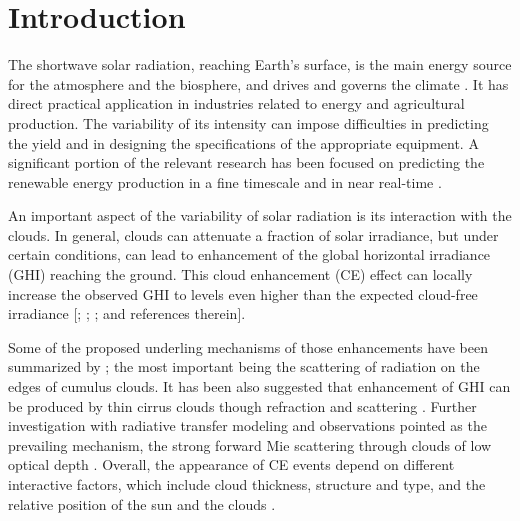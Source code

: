 \documentclass[preprint, 5p,
authoryear]{elsarticle} %
\begin{document}
\hypertarget{introduction}{%
\section{Introduction}\label{introduction}}

The shortwave solar radiation, reaching Earth's surface, is the main
energy source for the atmosphere and the biosphere, and drives and
governs the climate \citep{Gray2010}. It has direct practical
application in industries related to energy and agricultural production.
The variability of its intensity can impose difficulties in predicting
the yield and in designing the specifications of the appropriate
equipment. A significant portion of the relevant research has been
focused on predicting the renewable energy production in a fine
timescale and in near real-time \citep[for a review
see][]{Inman2013, Graabak2016}.

An important aspect of the variability of solar radiation is its
interaction with the clouds. In general, clouds can attenuate a fraction
of solar irradiance, but under certain conditions, can lead to
enhancement of the global horizontal irradiance (GHI) reaching the
ground. This cloud enhancement (CE) effect can locally increase the
observed GHI to levels even higher than the expected cloud-free
irradiance {[}\citet{Cordero2023}; \citet{Vamvakas2020};
\citet{CastillejoCuberos2020}; and references therein{]}.

Some of the proposed underling mechanisms of those enhancements have
been summarized by \citet{Gueymard2017}; the most important being the
scattering of radiation on the edges of cumulus clouds. It has been also
suggested that enhancement of GHI can be produced by thin cirrus clouds
though refraction and scattering \citep{Thuillier2013}. Further
investigation with radiative transfer modeling and observations pointed
as the prevailing mechanism, the strong forward Mie scattering through
clouds of low optical depth
\citep{Pecenak2016, Thuillier2013, Yordanov2013, Yordanov2015}. Overall,
the appearance of CE events depend on different interactive factors,
which include cloud thickness, structure and type, and the relative
position of the sun and the clouds \citep{Gueymard2017, Veerman2022}.
\end{document}
